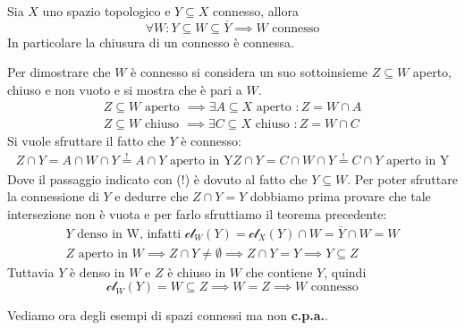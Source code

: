 \begin{theorema}\label{chiusuraconnessa}
	Sia $X$ uno spazio topologico e $Y\subseteq X$ connesso, allora
		\begin{equation*}
			\forall W \colon Y\subseteq W \subseteq \overline{Y} \implies W \text{ connesso}
		\end{equation*}
	In particolare la chiusura di un connesso è connessa.
\end{theorema}
\begin{demonstration}
	Per dimostrare che $W$ è connesso si considera un suo sottoinsieme $Z\subseteq W$ aperto, chiuso e non vuoto e si mostra che è pari a $W$.
		\begin{gather*}
			Z\subseteq W \text{ aperto } \implies \exists A\subseteq X \text{ aperto } \colon Z=W\cap A \\
			Z\subseteq W \text{ chiuso } \implies \exists C\subseteq X \text{ chiuso } \colon Z=W\cap C
		\end{gather*}
	Si vuole sfruttare il fatto che $Y$ è connesso:
		\begin{gather*}
			Z\cap Y=A\cap W\cap Y \stackrel{!}{=} A\cap Y \text{ aperto in Y}
			Z\cap Y=C\cap W\cap Y \stackrel{!}{=} C\cap Y \text{ aperto in Y}			
		\end{gather*}
	Dove il passaggio indicato con (!) è dovuto al fatto che $Y\subseteq W$. Per poter sfruttare la connessione di $Y$ e dedurre che $Z\cap Y=Y$ dobbiamo prima provare che tale intersezione non è vuota e per farlo sfruttiamo il teorema precedente:
		\begin{gather*}
			Y \text{ denso in W, infatti  } \mathcal{cl}_W(Y)=\mathcal{cl}_X(Y)\cap W=\overline{Y}\cap W=W\\
			Z \text{ aperto in } W \implies Z\cap Y \neq \emptyset \implies Z\cap Y=Y \implies Y\subseteq Z
		\end{gather*}
	Tuttavia $Y$ è denso in $W$ e $Z$ è chiuso in $W$ che contiene $Y$, quindi
		\begin{equation*}
			\mathcal{cl}_W(Y)=W\subseteq Z \implies W=Z \implies W \text{ connesso}
		\end{equation*}
\end{demonstration}
Vediamo ora degli esempi di spazi connessi ma non \textbf{c.p.a.}.
